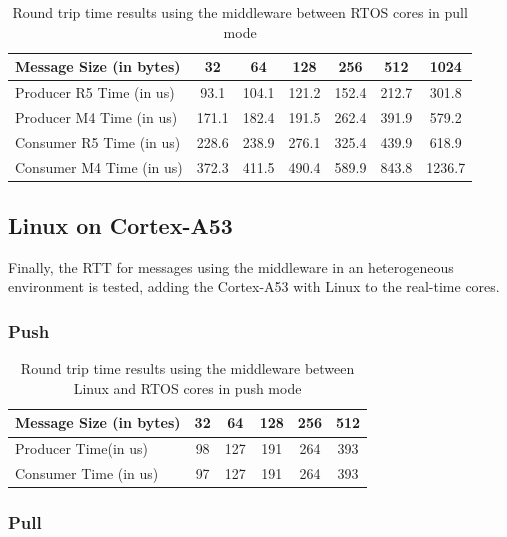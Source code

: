 \begin{table}[H]
\centering
\caption{Round trip time results using the middleware between RTOS cores in
         pull mode}
\label{table:broker_communication_RTOS_cores}
\begin{tabular}{lcccccc}
\toprule
Message Size (in bytes) & 32 & 64 & 128 & 256 & 512 & 1024 \\
\midrule
Producer R5 Time (in us) & 93.1 & 104.1 & 121.2 & 152.4 & 212.7 & 301.8 \\
Producer M4 Time (in us) & 171.1 & 182.4 & 191.5 & 262.4 & 391.9 & 579.2 \\
Consumer R5 Time (in us) & 228.6 & 238.9 & 276.1 & 325.4 & 439.9 & 618.9 \\
Consumer M4 Time (in us) & 372.3 & 411.5 & 490.4 & 589.9 & 843.8 & 1236.7 \\
\bottomrule
\end{tabular}
\end{table}

\subsection{Linux on Cortex-A53}

Finally, the RTT for messages using the middleware in an heterogeneous
environment is tested, adding the Cortex-A53 with Linux to the real-time cores.

\subsubsection{Push}

\begin{table}[H]
\centering
\caption{Round trip time results using the middleware between Linux and RTOS
    cores in push mode}
\label{table:broker_communication_linux_RTOS_cores_push}
\begin{tabular}{lccccc}
\toprule
Message Size (in bytes) & 32 & 64 & 128 & 256 & 512 \\
\midrule
Producer Time(in us) & 98 & 127 & 191 & 264 & 393 \\
Consumer Time (in us) & 97 & 127 & 191 & 264 & 393 \\
\bottomrule
\end{tabular}
\end{table}

\subsubsection{Pull}

